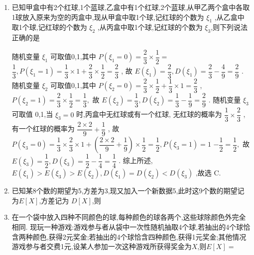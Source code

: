 \begin{enumerate}
\item 已知甲盒中有2个红球,1个蓝球,乙盒中有1个红球,2个蓝球,从甲乙两个盒中各取1球放入原来为空的丙盒中,现从甲盒中取1个球,记红球的个数为 $\xi_{1}$ ,从乙盒中取1个球,记红球的个数为 $\xi_{2}$ ,从丙盒中取1个球,记红球的个数为 $\xi_{3}$,则下列说法正确的是
\begin{jieda}
    随机变量 ${\xi }_{1}$ 可取值0,1,其中 $P\left( {{\xi }_{1} = 0}\right)  = \dfrac{2}{3} \times  \dfrac{1}{2} =$
$\dfrac{1}{3},P\left( {{\xi }_{1} = 1}\right)  = \dfrac{1}{3} \times  1 + \dfrac{2}{3} \times  \dfrac{1}{2} = \dfrac{2}{3}$ ,
故 $E\left( {\xi }_{1}\right)  = \dfrac{2}{3},D\left( {\xi }_{1}\right)  = \dfrac{2}{3} - \dfrac{4}{9} = \dfrac{2}{9}$ .
随机变量 ${\xi }_{2}$ 可取值0,1,其中 $P\left( {{\xi }_{2} = 0}\right)  = \dfrac{2}{3} \times  \dfrac{1}{2} + \dfrac{1}{3} \times  1 = \dfrac{2}{3}$ ,
$P\left( {{\xi }_{2} = 1}\right)  = \dfrac{2}{3} \times  \dfrac{1}{2} = \dfrac{1}{3},$
故 $E\left( {\xi }_{2}\right)  = \dfrac{1}{3},D\left( {\xi }_{2}\right)  = \dfrac{1}{3} - \dfrac{1}{9} = \dfrac{2}{9}$ .
随机变量 ${\xi }_{3}$ 可取值 0,1,当 ${\xi }_{3} = 0$ 时,丙盒中无红球或有一个红球,
无红球的概率为 $\dfrac{1}{3} \times  \dfrac{2}{3}$ ,有一个红球的概率为 $\dfrac{2 \times  2}{9} + \dfrac{1}{9}$ ,
故 $P\left( {{\xi }_{3} = 0}\right)  = \dfrac{1}{3} \times  \dfrac{2}{3} \times  1 + \left( {\dfrac{2 \times  2}{9} + \dfrac{1}{9}}\right)  \times  \dfrac{1}{2} = \dfrac{1}{2},P\left( {{\xi }_{3} = 1}\right)  = 1$
$- \dfrac{1}{2} = \dfrac{1}{2},$
故 $E\left( {\xi }_{3}\right)  = \dfrac{1}{2},D\left( {\xi }_{3}\right)  = \dfrac{1}{2} - \dfrac{1}{4} = \dfrac{1}{4}$ .
综上所述, $E\left( {\xi }_{1}\right)  > E\left( {\xi }_{3}\right)  > E\left( {\xi }_{2}\right) ,D\left( {\xi }_{1}\right)  = D\left( {\xi }_{2}\right)  < D\left( {\xi }_{3}\right)$ ,故选 C.
\end{jieda}

\item 已知某8个数的期望为5,方差为3,现又加入一个新数据5,此时这9个数的期望记为$E[X]$,方差记为 $D[X]$,则

\item 在一个袋中放入四种不同颜色的球,每种颜色的球各两个,这些球除颜色外完全相同. 现玩一种游戏:游戏参与者从袋中一次性随机抽取4个球,若抽出的4个球恰含两种颜色,获得2元奖金;若抽出的4个球恰含四种颜色,获得1元奖金;其他情况游戏参与者交费1元,设某人参加一次这种游戏所获得奖金为$X$,则$E[X]=$


\end{enumerate}
